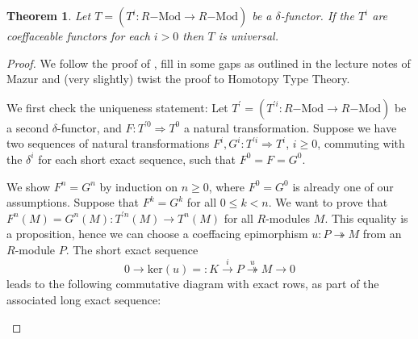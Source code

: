\documentclass{amsart}
\theoremstyle{plain}
\newtheorem{thm}{Theorem}[section]
\numberwithin{equation}{section} %
\numberwithin{figure}{section} %
\theoremstyle{plain}
\theoremstyle{plain}
\theoremstyle{plain}
\theoremstyle{plain}
\theoremstyle{plain}
\theoremstyle{plain}
\theoremstyle{remark}
\theoremstyle{remark}
\theoremstyle{remark}
\begin{document}
\begin{thm} \label{eff-univ-delta-thm}
Let $T = (T^i: R\mathrm{-Mod} \rightarrow R\mathrm{-Mod})$ be a $\delta$-functor. If the $T^i$ are coeffaceable functors for each $i > 0$ then $T$ is universal.
\end{thm}
\begin{proof}
We follow the proof of \cite[Thm.XX.7.1]{Lang-Alg}, fill in some gaps as outlined in the lecture notes of Mazur \cite{Maz} and (very slightly) twist the proof to Homotopy Type Theory. 

We first check the uniqueness statement:
Let $T^\prime = (T^{\prime i}: R\mathrm{-Mod} \rightarrow R\mathrm{-Mod})$ be a second $\delta$-functor, and $F: T^{\prime 0} \Rightarrow T^0$ a natural transformation. Suppose we have two sequences of natural transformations $F^i, G^i: T^{\prime i} \Rightarrow T^i$, $i \geq 0$, commuting with the $\delta^i$ for each short exact sequence, such that $F^0 = F = G^0$.

We show $F^n = G^n$ by induction on $n \geq 0$, where $F^0 = G^0$ is already one of our assumptions. Suppose that $F^k = G^k$ for all $0 \leq k < n$. We want to prove that $F^n(M) = G^n(M): T^{\prime n}(M) \rightarrow T^n(M)$ for all $R$-modules $M$. This equality is a proposition, hence we can choose a coeffacing epimorphism $u: P \twoheadrightarrow M$ from an $R$-module $P$. The short exact sequence
\[ 0 \rightarrow \mathrm{ker}(u) =: K \stackrel{i}{\rightarrow} P \stackrel{u}{\twoheadrightarrow} M \rightarrow 0 \]
leads to the following commutative diagram with exact rows, as part of the associated long exact sequence:

\begin{center}
\end{center}


\end{proof}
\end{document}
